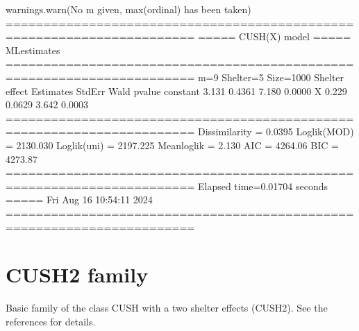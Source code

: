 \documentclass[letterpaper,10pt,english]{sphinxmanual}
\begin{document}
\begin{sphinxVerbatim}[commandchars=\\\{\}]
warnings.warn(\PYGZdq{}No m given, max(ordinal) has been taken\PYGZdq{})
=======================================================================
=====\PYGZgt{}\PYGZgt{}\PYGZgt{} CUSH(X) model \PYGZlt{}\PYGZlt{}\PYGZlt{}===== ML\PYGZhy{}estimates
=======================================================================
m=9  Shelter=5  Size=1000
\PYGZhy{}\PYGZhy{}\PYGZhy{}\PYGZhy{}\PYGZhy{}\PYGZhy{}\PYGZhy{}\PYGZhy{}\PYGZhy{}\PYGZhy{}\PYGZhy{}\PYGZhy{}\PYGZhy{}\PYGZhy{}\PYGZhy{}\PYGZhy{}\PYGZhy{}\PYGZhy{}\PYGZhy{}\PYGZhy{}\PYGZhy{}\PYGZhy{}\PYGZhy{}\PYGZhy{}\PYGZhy{}\PYGZhy{}\PYGZhy{}\PYGZhy{}\PYGZhy{}\PYGZhy{}\PYGZhy{}\PYGZhy{}\PYGZhy{}\PYGZhy{}\PYGZhy{}\PYGZhy{}\PYGZhy{}\PYGZhy{}\PYGZhy{}\PYGZhy{}\PYGZhy{}\PYGZhy{}\PYGZhy{}\PYGZhy{}\PYGZhy{}\PYGZhy{}\PYGZhy{}\PYGZhy{}\PYGZhy{}\PYGZhy{}\PYGZhy{}\PYGZhy{}\PYGZhy{}\PYGZhy{}\PYGZhy{}\PYGZhy{}\PYGZhy{}\PYGZhy{}\PYGZhy{}\PYGZhy{}\PYGZhy{}\PYGZhy{}\PYGZhy{}\PYGZhy{}\PYGZhy{}\PYGZhy{}\PYGZhy{}\PYGZhy{}\PYGZhy{}\PYGZhy{}\PYGZhy{}
Shelter effect
          Estimates  StdErr    Wald  p\PYGZhy{}value
constant     \PYGZhy{}3.131  0.4361  \PYGZhy{}7.180   0.0000
X             0.229  0.0629   3.642   0.0003
=======================================================================
Dissimilarity = 0.0395
Loglik(MOD)   = \PYGZhy{}2130.030
Loglik(uni)   = \PYGZhy{}2197.225
Mean\PYGZhy{}loglik   = \PYGZhy{}2.130
\PYGZhy{}\PYGZhy{}\PYGZhy{}\PYGZhy{}\PYGZhy{}\PYGZhy{}\PYGZhy{}\PYGZhy{}\PYGZhy{}\PYGZhy{}\PYGZhy{}\PYGZhy{}\PYGZhy{}\PYGZhy{}\PYGZhy{}\PYGZhy{}\PYGZhy{}\PYGZhy{}\PYGZhy{}\PYGZhy{}\PYGZhy{}\PYGZhy{}\PYGZhy{}\PYGZhy{}\PYGZhy{}\PYGZhy{}\PYGZhy{}\PYGZhy{}\PYGZhy{}\PYGZhy{}\PYGZhy{}\PYGZhy{}\PYGZhy{}\PYGZhy{}\PYGZhy{}\PYGZhy{}\PYGZhy{}\PYGZhy{}\PYGZhy{}\PYGZhy{}\PYGZhy{}\PYGZhy{}\PYGZhy{}\PYGZhy{}\PYGZhy{}\PYGZhy{}\PYGZhy{}\PYGZhy{}\PYGZhy{}\PYGZhy{}\PYGZhy{}\PYGZhy{}\PYGZhy{}\PYGZhy{}\PYGZhy{}\PYGZhy{}\PYGZhy{}\PYGZhy{}\PYGZhy{}\PYGZhy{}\PYGZhy{}\PYGZhy{}\PYGZhy{}\PYGZhy{}\PYGZhy{}\PYGZhy{}\PYGZhy{}\PYGZhy{}\PYGZhy{}\PYGZhy{}\PYGZhy{}
AIC = 4264.06
BIC = 4273.87
=======================================================================
Elapsed time=0.01704 seconds =====\PYGZgt{}\PYGZgt{}\PYGZgt{} Fri Aug 16 10:54:11 2024
=======================================================================
\end{sphinxVerbatim}

\noindent{}


\section{CUSH2 family}
\label{\detokenize{manual:cush2-family}}
\sphinxAtStartPar
Basic family of the class CUSH with a two shelter effects (CUSH2).
See the references for details.
\end{document}
